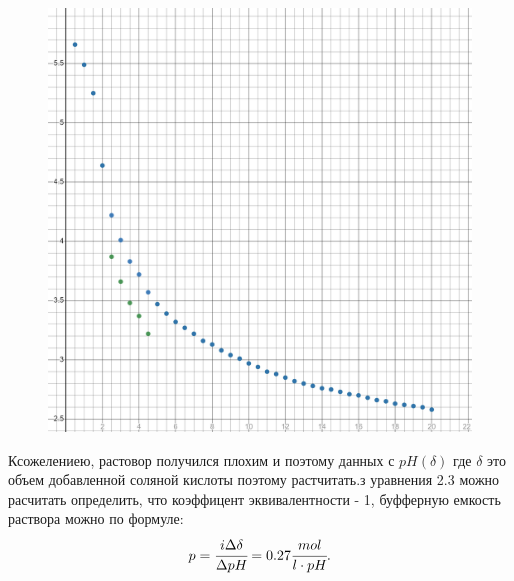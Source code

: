 \documentclass[a4paper]{article}
\newcommand{\inner}[1]{\left( #1 \right)}
\numberwithin{equation}{section}
\begin{document}
\begin{figure}[h]
    \centering
    \includegraphics[width=0.7\linewidth]{desmos-graph.png}
     \caption{}
    \label{pn}
\end{figure}

Ксожелениею, растовор получился плохим и поэтому данных с 
$pH\inner{\delta}$ где $\delta$ это объем добавленной соляной кислоты
поэтому растчитать.з уравнения 2.3 можно расчитать определить, что 
коэффицент эквивалентности - 1, буфферную емкость раствора можно 
по формуле:
\begin{equation} 
 p = \cfrac{i\Delta \delta}{\Delta pH} = 0.27 \cfrac{mol}{l\cdot pH}.
\end{equation}    
\end{document}
